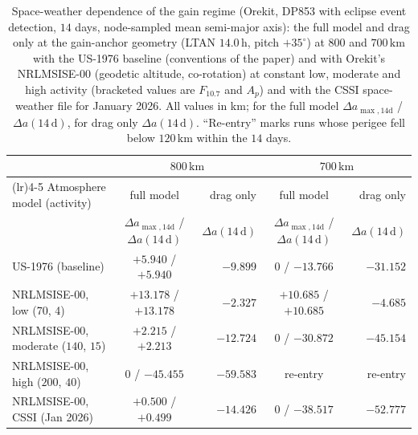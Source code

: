 \begin{table}[htbp]
\centering
\caption{Space-weather dependence of the gain regime (Orekit, DP853 with eclipse event detection, \(14\) days, node-sampled mean semi-major axis): the full model and drag only at the gain-anchor geometry (LTAN \(14.0\,\mathrm{h}\), pitch \(+35^\circ\)) at \(800\) and \(700\,\mathrm{km}\) with the US-1976 baseline (conventions of the paper) and with Orekit's NRLMSISE-00 (geodetic altitude, co-rotation) at constant low, moderate and high activity (bracketed values are \(F_{10.7}\) and \(A_p\)) and with the CSSI space-weather file for January 2026. All values in km; for the full model \(\Delta a_{\max,14\mathrm{d}}\) / \(\Delta a(14\,\mathrm{d})\), for drag only \(\Delta a(14\,\mathrm{d})\). ``Re-entry'' marks runs whose perigee fell below \(120\,\mathrm{km}\) within the \(14\) days.}
\label{tab:space_weather}
\vspace{0.5em}
\footnotesize
\setlength{\tabcolsep}{3pt}
\begin{tabular}{>{\raggedright\arraybackslash}p{3.0cm} c r c r}
\toprule
& \multicolumn{2}{c}{\(800\,\mathrm{km}\)} & \multicolumn{2}{c}{\(700\,\mathrm{km}\)} \\
\cmidrule(lr){2-3} \cmidrule(lr){4-5}
Atmosphere model (activity) & full model & drag only & full model & drag only \\
& \(\Delta a_{\max,14\mathrm{d}}\) / \(\Delta a(14\,\mathrm{d})\) & \(\Delta a(14\,\mathrm{d})\) & \(\Delta a_{\max,14\mathrm{d}}\) / \(\Delta a(14\,\mathrm{d})\) & \(\Delta a(14\,\mathrm{d})\) \\
\midrule
US-1976 (baseline) & \(+5.940\) / \(+5.940\) & \(-9.899\) & \(0\) / \(-13.766\) & \(-31.152\) \\
NRLMSISE-00, low (70, 4) & \(+13.178\) / \(+13.178\) & \(-2.327\) & \(+10.685\) / \(+10.685\) & \(-4.685\) \\
NRLMSISE-00, moderate (\(140\), \(15\)) & \(+2.215\) / \(+2.213\) & \(-12.724\) & \(0\) / \(-30.872\) & \(-45.154\) \\
NRLMSISE-00, high (\(200\), \(40\)) & \(0\) / \(-45.455\) & \(-59.583\) & re-entry & re-entry \\
NRLMSISE-00, CSSI (Jan 2026) & \(+0.500\) / \(+0.499\) & \(-14.426\) & \(0\) / \(-38.517\) & \(-52.777\) \\
\bottomrule
\end{tabular}
\end{table}

